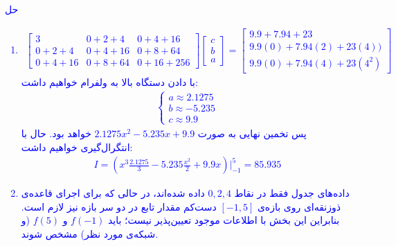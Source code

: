 \textcolor{blue}{حل
\\
\begin{enumerate}
    \item
    \begin{align*}
    \begin{bmatrix}
        3 & 0 + 2 + 4 & 0 + 4 + 16 \\
        0 + 2 + 4 & 0 + 4 + 16 & 0 + 8 + 64 \\
        0 + 4 + 16 & 0 + 8 + 64 & 0 + 16 + 256
    \end{bmatrix}
    \begin{bmatrix}
        c \\ b \\ a
    \end{bmatrix} = \begin{bmatrix}
        9.9 + 7.94 + 23 \\
        9.9 (0) + 7.94 (2) + 23 (4)) \\
        9.9 (0) + 7.94 (4) + 23 (4^2)
    \end{bmatrix}
    \end{align*}
    با دادن دستگاه بالا به ولفرام خواهیم داشت:
    \begin{align*}
        \begin{cases}
            a \approx 2.1275 \\
            b \approx -5.235 \\
            c \approx 9.9
        \end{cases}
    \end{align*}
    پس تخمین نهایی به صورت
    $2.1275 x^2 - 5.235x + 9.9$
    خواهد بود. حال با انتگرال‌گیری خواهیم داشت:
    \begin{align*}
        I = (x^3 \frac{2.1275}{3} - 5.235 \frac{x^2}{2} + 9.9 x) \Biggr|^{5}_{-1} = 85.935 
    \end{align*}
    \item 
    داده‌های جدول فقط در نقاط
    \(0,2,4\)
    داده شده‌اند، در حالی که برای اجرای قاعده‌ی ذوزنقه‌ای روی بازه‌ی
    \([-1,5]\)
    دست‌کم مقدار تابع در دو سر بازه نیز لازم است. بنابراین این بخش با اطلاعات موجود تعیین‌پذیر نیست؛ باید
    \(f(-1)\)
    و
    \(f(5)\)
    (و شبکه‌ی مورد نظر) مشخص شوند.
\end{enumerate}
}
